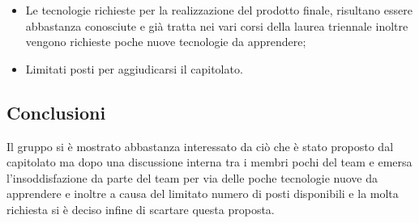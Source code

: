 \begin{itemize}
\item Le tecnologie richieste per la realizzazione del prodotto finale, risultano essere abbastanza conosciute e gi\`a tratta nei vari corsi della laurea triennale inoltre vengono richieste poche nuove tecnologie da apprendere;
\item Limitati posti per aggiudicarsi il capitolato.

\end{itemize}
\subsection{Conclusioni}
Il gruppo si \`e mostrato abbastanza interessato da ci\`o che \`e stato proposto dal capitolato ma dopo una discussione interna tra i membri pochi del team e emersa l'insoddisfazione da parte del team per via delle poche tecnologie nuove da apprendere e inoltre a causa del limitato numero di posti disponibili e la molta richiesta si \`e deciso infine di scartare questa proposta.